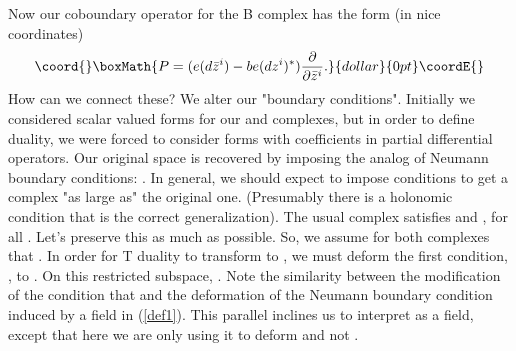 \documentclass[a4paper,11pt]{amsart}
\begin{document}
Now our coboundary operator for the B complex has the form
 (in nice coordinates)
$$\coord{}\boxMath{P = (e(d\bar z^i)-be(dz^i)^*)\frac{\partial}{\partial \bar z^i}.}{dollar}{0pt}\coordE{}$$
How can we connect these? We alter our "boundary conditions". Initially
we considered scalar valued forms for our \coordHE{} and \coordHE{} complexes, but in order to
define \coordHE{} duality, we were forced to consider forms with
coefficients in partial differential operators. Our original space is recovered 
by imposing the analog of Neumann boundary conditions: \coordHE{}. 
In general, we should expect to impose \coordHE{} conditions to get a complex
"as large as" the original one. (Presumably there is a holonomic condition that
is the correct generalization). The usual complex satisfies 
\coordHE{} and \coordHE{}, for all \coordHE{}. Let's preserve this as much
 as possible. 
So, we assume for both complexes that \coordHE{}. In order for T duality
to transform \coordHE{} to \coordHE{}, we must deform the first condition, \coordHE{},
 to 
\coordHE{}. 
On this restricted subspace, \coordHE{}. Note the
similarity between the modification of the condition that \coordHE{} 
and the deformation of the Neumann boundary
condition induced by a \coordHE{} field in (\ref{def1}). This parallel inclines us to
interpret \coordHE{} as a \coordHE{} field, except that here we are only using it to
deform \coordHE{} and not \coordHE{}.
 
\end{document}
